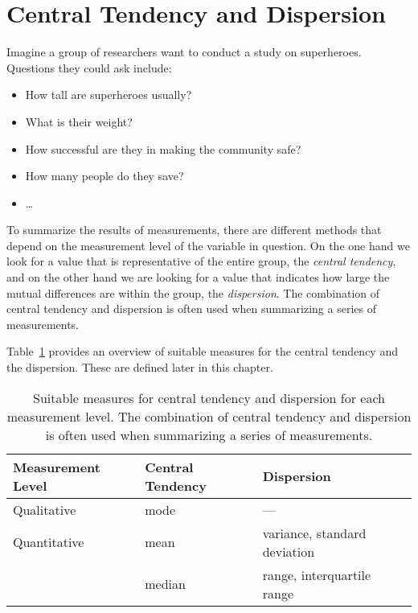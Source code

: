 \section{Central Tendency and Dispersion}

Imagine a group of researchers want to conduct a study on superheroes. Questions they could ask include:

\begin{itemize}
    \item How tall are superheroes usually?
    \item What is their weight?
    \item How successful are they in making the community safe?
    \item How many people do they save?
    \item \ldots
\end{itemize}

To summarize the results of measurements, there are different methods that depend on the measurement level of the variable in question. On the one hand we look for a value that is representative of the entire group, the \emph{central tendency}, and on the other hand we are looking for a value that indicates how large the mutual differences are within the group, the \emph{dispersion}. The combination of central tendency and dispersion is often used when summarizing a series of measurements.

Table~\ref{tab:centrum-spreidingsmaten} provides an overview of suitable measures for the central tendency and the dispersion. These are defined later in this chapter.


\begin{table}
    \centering
    \begin{tabular}{lll}
        \toprule
        \textbf{Measurement Level}  & \textbf{Central Tendency} & \textbf{Dispersion} \\
        \midrule
        Qualitative                 & mode                      & ---                 \\
        \midrule
        Quantitative                & mean            & variance, standard deviation  \\
                                    & median          & range, interquartile range    \\
        \bottomrule
    \end{tabular}
    \caption[Suitable measures for central tendency and dispersion for each measurement level.]{Suitable measures for central tendency and dispersion for each measurement level. The combination of central tendency and dispersion is often used when summarizing a series of measurements.}
    \label{tab:centrum-spreidingsmaten}
\end{table}

